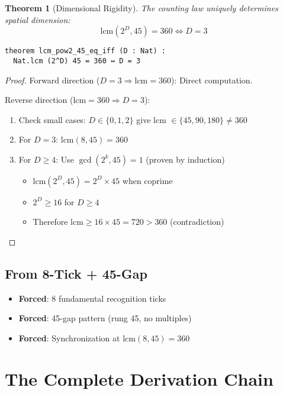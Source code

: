 \documentclass[11pt]{article}
\newtheorem{theorem}{Theorem}[section]
\theoremstyle{definition}
\theoremstyle{remark}
\begin{document}
\begin{theorem}[Dimensional Rigidity]
\label{thm:dimension-three}
The counting law uniquely determines spatial dimension:
$$\text{lcm}(2^D, 45) = 360 \iff D = 3$$
\begin{lstlisting}[language=lean]
theorem lcm_pow2_45_eq_iff (D : Nat) :
  Nat.lcm (2^D) 45 = 360 ↔ D = 3
\end{lstlisting}
\end{theorem}

\begin{proof}
Forward direction ($D=3 \Rightarrow \text{lcm}=360$): Direct computation.

Reverse direction ($\text{lcm}=360 \Rightarrow D=3$):
\begin{enumerate}
\item Check small cases: $D \in \{0,1,2\}$ give lcm $\in \{45, 90, 180\} \neq 360$
\item For $D=3$: $\text{lcm}(8,45) = 360$ \checkmark
\item For $D \geq 4$: Use $\gcd(2^k, 45) = 1$ (proven by induction)
  \begin{itemize}
  \item $\text{lcm}(2^D, 45) = 2^D \times 45$ when coprime
  \item $2^D \geq 16$ for $D \geq 4$
  \item Therefore $\text{lcm} \geq 16 \times 45 = 720 > 360$ (contradiction)
  \end{itemize}
\end{enumerate}
\end{proof}

\subsection{From 8-Tick + 45-Gap}

\begin{itemize}
\item[\checkmark] \textbf{Forced}: 8 fundamental recognition ticks
\item[\checkmark] \textbf{Forced}: 45-gap pattern (rung 45, no multiples)
\item[\checkmark] \textbf{Forced}: Synchronization at $\text{lcm}(8,45) = 360$
\end{itemize}

\section{The Complete Derivation Chain}
\end{document}
